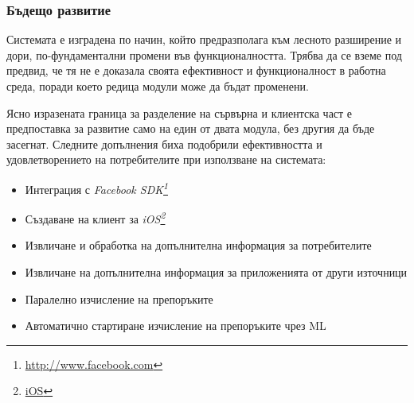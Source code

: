 \subsubsection{Бъдещо развитие}

	Системата е изградена по начин, който предразполага към лесното разширение и дори, по-фундаментални промени във функционалността.
	Трябва да се вземе под предвид, че тя не е доказала своята ефективност и функционалност в работна среда, поради което редица модули може да бъдат променени.
	
	Ясно изразената граница за разделение на сървърна и клиентска част е предпоставка за развитие само на един от двата модула, без другия да бъде засегнат. Следните допълнения биха подобрили ефективността и удовлетворението на потребителите при използване на системата:
	
	\begin{itemize}
		\item Интеграция с \emph{Facebook SDK\footnote{\url{http://www.facebook.com}}}
		\item Създаване на клиент за \emph{iOS\footnote{\url{iOS}}}
		\item Извличане и обработка на допълнителна информация за потребителите
		\item Извличане на допълнителна информация за приложенията от други източници
		\item Паралелно изчисление на препоръките
		\item Автоматично стартиране изчисление на препоръките чрез \ac{ML}
	\end{itemize}